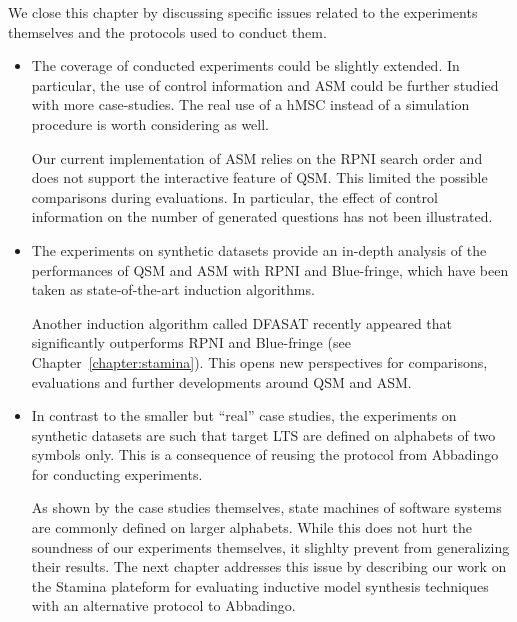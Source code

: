 We close this chapter by discussing specific issues related to the experiments themselves and the protocols used to conduct them. 
\begin{itemize}

\item The coverage of conducted experiments could be slightly extended. In particular, the use of control information and ASM could be further studied with more case-studies. The real use of a hMSC instead of a simulation procedure is worth considering as well.

Our current implementation of ASM relies on the RPNI search order and does not support the interactive feature of QSM. This limited the possible comparisons during evaluations. In particular, the effect of control information on the number of generated questions has not been illustrated.

\item The experiments on synthetic datasets provide an in-depth analysis of the performances of QSM and ASM with RPNI and Blue-fringe, which have been taken as state-of-the-art induction algorithms. 

Another induction algorithm called DFASAT recently appeared that significantly outperforms RPNI and Blue-fringe \cite{Heule:2010} (see Chapter~\ref{chapter:stamina}). This opens new perspectives for comparisons, evaluations and further developments around QSM and ASM. 

\item In contrast to the smaller but ``real'' case studies, the experiments on synthetic datasets are such that target LTS are defined on alphabets of two symbols only. This is a consequence of reusing the protocol from Abbadingo for conducting experiments. 

As shown by the case studies themselves, state machines of software systems are commonly defined on larger alphabets. While this does not hurt the soundness of our experiments themselves, it slighlty prevent from generalizing their results. The next chapter addresses this issue by describing our work on the Stamina plateform for evaluating inductive model synthesis techniques with an alternative protocol to Abbadingo.
\end{itemize}
